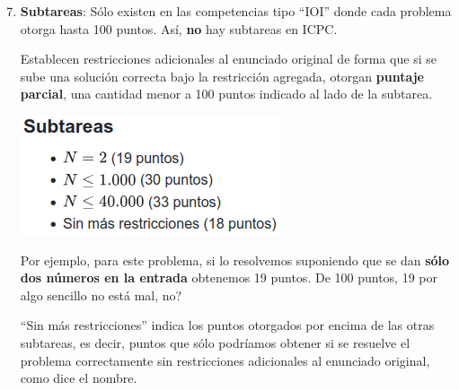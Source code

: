 \documentclass{beamer}
\begin{document}
    \begin{frame}[noframenumbering]
        \begin{enumerate}
            \setcounter{enumi}{6}
            \item \textbf{Subtareas}: Sólo existen en las competencias tipo ``IOI'' donde cada problema otorga hasta 100 puntos. Así, \textbf{no} hay subtareas en ICPC. \pause

                Establecen restricciones adicionales al enunciado original de forma que si se sube una solución correcta bajo la restricción agregada, otorgan \textbf{puntaje parcial}, una cantidad menor a 100 puntos indicado al lado de la subtarea. \pause

            \begin{center}
                \includegraphics[width=.4\linewidth]{./ou_subtasks.png}
            \end{center}\pause

            Por ejemplo, para este problema, si lo resolvemos suponiendo que se dan \textbf{sólo dos números en la entrada} obtenemos 19 puntos. \pause De 100 puntos, 19 por algo sencillo no está mal, no? \pause

            ``Sin más restricciones'' indica los puntos otorgados por encima de las otras subtareas, es decir, puntos que sólo podríamos obtener si se resuelve el problema correctamente sin restricciones adicionales al enunciado original, como dice el nombre.
        \end{enumerate}
    \end{frame}
\end{document}
